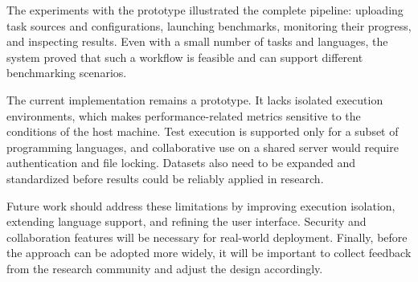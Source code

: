 The experiments with the prototype illustrated the complete pipeline: uploading task sources and configurations, launching benchmarks, monitoring their progress, and inspecting results.
Even with a small number of tasks and languages, the system proved that such a workflow is feasible and can support different benchmarking scenarios.

The current implementation remains a prototype.
It lacks isolated execution environments, which makes performance-related metrics sensitive to the conditions of the host machine.
Test execution is supported only for a subset of programming languages, and collaborative use on a shared server would require authentication and file locking.
Datasets also need to be expanded and standardized before results could be reliably applied in research.

Future work should address these limitations by improving execution isolation, extending language support, and refining the user interface.
Security and collaboration features will be necessary for real-world deployment.
Finally, before the approach can be adopted more widely, it will be important to collect feedback from the research community and adjust the design accordingly.


